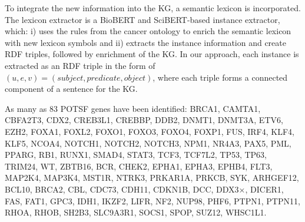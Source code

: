 \hspace*{3.5mm} To integrate the new information into the KG, a semantic lexicon is incorporated. The lexicon extractor is a BioBERT and SciBERT-based instance extractor, which: i) uses the rules from the cancer ontology to enrich the semantic lexicon with new lexicon symbols and ii) extracts the instance information and create RDF triples, followed by enrichment of the KG. In our approach, each instance is extracted as an RDF triple in the form of $(u,e,v)=(\mathit{subject},\mathit{predicate},\mathit{object})$, where each triple forms a connected component of a sentence for the KG. 

\hspace*{3.5mm} As many as 83 POTSF genes 
have been identified: 
BRCA1, CAMTA1, CBFA2T3, CDX2, CREB3L1, CREBBP, DDB2, DNMT1, DNMT3A, ETV6, EZH2, FOXA1, FOXL2, FOXO1, FOXO3, FOXO4, FOXP1, FUS, IRF4, KLF4, KLF5, NCOA4, NOTCH1, NOTCH2, NOTCH3, NPM1, NR4A3, PAX5, PML, PPARG, RB1, RUNX1, SMAD4, STAT3, TCF3, TCF7L2, TP53, TP63, TRIM24, WT, ZBTB16, BCR, CHEK2, EPHA1, EPHA3, EPHB4, FLT3, MAP2K4, MAP3K4, MST1R, NTRK3, PRKAR1A, PRKCB, SYK, ARHGEF12, BCL10, BRCA2, CBL, CDC73, CDH11, CDKN1B, DCC, DDX3×, DICER1, FAS, FAT1, GPC3, IDH1, IKZF2, LIFR, NF2, NUP98, PHF6, PTPN1, PTPN11, RHOA, RHOB, SH2B3, SLC9A3R1, SOCS1, SPOP, SUZ12, WHSC1L1. 

